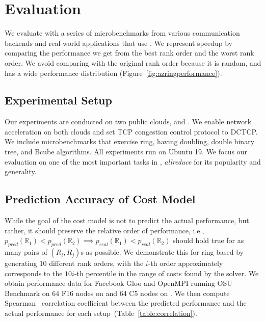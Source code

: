 \section{Evaluation}
We evaluate \cmpi with a series of microbenchmarks from various communication backends and real-world applications that use \collectives. We represent speedup by comparing the performance we get from the best rank order and the worst rank order. We avoid comparing with the original rank order because it is random, and has a wide performance distribution (Figure~\ref{fig:azringperformance}).

\subsection{Experimental Setup}
Our experiments are conducted on two public clouds, \azure and \ectwo. We enable network acceleration on both clouds and set TCP congestion control protocol to DCTCP. We include microbenchmarks that exercise ring, having doubling, double binary tree, and Bcube algorithms.  All experiments run on Ubuntu 19. We focus our evaluation on one of the most important tasks in \mpi, \textit{allreduce} for its popularity and generality. %

\subsection{Prediction Accuracy of Cost Model}
While the goal of the cost model is not to predict the actual performance, but rather, it should preserve the relative order of performance, i.e., $p_{pred}(\mathbb{R}_1) < p_{pred}(\mathbb{R}_2) \implies p_{real}(\mathbb{R}_1) < p_{real}(\mathbb{R}_2)$ should hold true for as many pairs of $(R_i, R_j)$s as possible. We demonstrate this for ring based \mpi by generating 10 different rank orders, with the $i$-th order approximately corresponds to the $10i$-th percentile in the range of costs found by the solver. We obtain performance data for Facebook Gloo and OpenMPI running OSU Benchmark on 64 F16 nodes on \azure and 64 C5 nodes on \ectwo. We then compute Spearman~\cite{spearman} correlation coefficient between the predicted performance and the actual performance for each setup~(Table~\ref{table:correlation}). 

